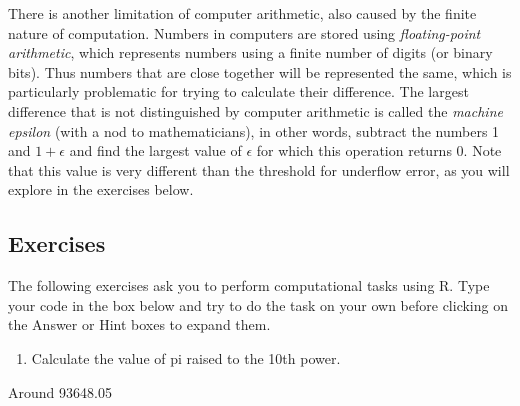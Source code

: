 \documentclass[
  letterpaper,
  DIV=11,
  numbers=noendperiod]{scrreprt}
\newenvironment{Shaded}{\begin{snugshade}}{\end{snugshade}}
\providecommand{\tightlist}{%
  \setlength{\itemsep}{0pt}\setlength{\parskip}{0pt}}\usepackage{longtable,booktabs,array}
\begin{document}
There is another limitation of computer arithmetic, also caused by the
finite nature of computation. Numbers in computers are stored using
\emph{floating-point arithmetic}, which represents numbers using a
finite number of digits (or binary bits). Thus numbers that are close
together will be represented the same, which is particularly problematic
for trying to calculate their difference. The largest difference that is
not distinguished by computer arithmetic is called the \emph{machine
epsilon} (with a nod to mathematicians), in other words, subtract the
numbers 1 and \(1+\epsilon\) and find the largest value of \(\epsilon\)
for which this operation returns 0. Note that this value is very
different than the threshold for underflow error, as you will explore in
the exercises below.

\hypertarget{exercises}{%
\subsection*{Exercises}\label{exercises}}

The following exercises ask you to perform computational tasks using R.
Type your code in the box below and try to do the task on your own
before clicking on the Answer or Hint boxes to expand them.

\begin{enumerate}
\def\labelenumi{\arabic{enumi}.}
\tightlist
\item
  Calculate the value of pi raised to the 10th power.
\end{enumerate}

\begin{Shaded}
\begin{Highlighting}[]

\end{Highlighting}
\end{Shaded}

\begin{tcolorbox}[enhanced jigsaw, arc=.35mm, colframe=quarto-callout-caution-color-frame, left=2mm, opacitybacktitle=0.6, breakable, title=\textcolor{quarto-callout-caution-color}{\faFire}\hspace{0.5em}{Answer}, toprule=.15mm, coltitle=black, bottomtitle=1mm, toptitle=1mm, colback=white, leftrule=.75mm, colbacktitle=quarto-callout-caution-color!10!white, titlerule=0mm, opacityback=0, rightrule=.15mm, bottomrule=.15mm]

Around 93648.05

\end{tcolorbox}
\end{document}

